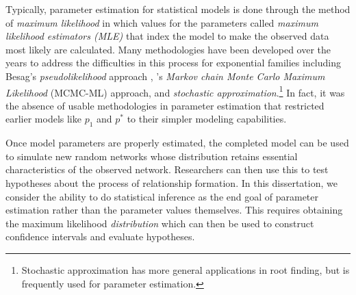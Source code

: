 Typically, parameter estimation for statistical models is done through the method of 
\emph{maximum likelihood} in which values for the parameters called \emph{maximum 
likelihood estimators (MLE)} that index the model to make the observed data most likely 
are calculated.
Many methodologies have been developed over the years to address the difficulties
in this process for exponential families
including Besag's \emph{pseudolikelihood} approach \citep{Besag:1974,Strauss:1990}, 
\citeauthor{Geyer:1992}'s \citeyearpar{Geyer:1992}
\emph{Markov chain Monte Carlo Maximum Likelihood} (MCMC-ML) approach, and 
\emph{stochastic approximation}.\footnote{Stochastic approximation has more general
applications in root finding, but is frequently used for parameter estimation.}
In fact, it was the absence of usable methodologies in parameter estimation that 
restricted earlier models like $p_1$ and $p^*$ to their simpler modeling capabilities.


Once model parameters are properly estimated, the completed model can be used to simulate 
new random networks whose distribution retains essential characteristics of 
the observed network.  Researchers can then use this 
to test hypotheses about the process of relationship formation.  
In this dissertation, we consider the ability to do statistical inference 
as the end goal of parameter estimation rather than the parameter values 
themselves.  This requires obtaining the maximum likelihood \emph{distribution} which
can then be used to construct confidence intervals and evaluate hypotheses.



